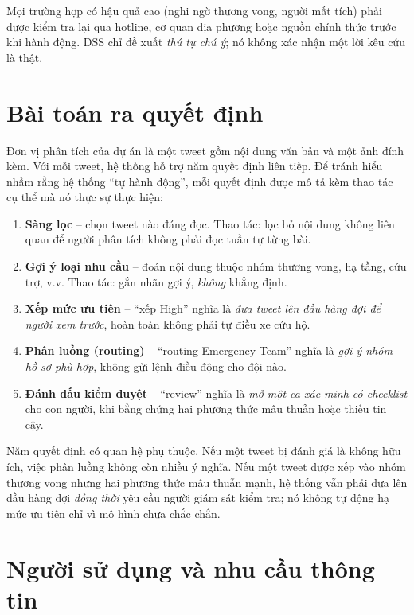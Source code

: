 \begin{insight}
Mọi trường hợp có hậu quả cao (nghi ngờ thương vong, người mất tích) phải được
kiểm tra lại qua hotline, cơ quan địa phương hoặc nguồn chính thức trước khi
hành động. DSS chỉ đề xuất \emph{thứ tự chú ý}; nó không xác nhận một lời kêu
cứu là thật.
\end{insight}

\section{Bài toán ra quyết định}

Đơn vị phân tích của dự án là một tweet gồm nội dung văn bản và một ảnh đính
kèm. Với mỗi tweet, hệ thống hỗ trợ năm quyết định liên tiếp. Để tránh hiểu
nhầm rằng hệ thống ``tự hành động'', mỗi quyết định được mô tả kèm thao tác cụ
thể mà nó thực sự thực hiện:

\begin{enumerate}[leftmargin=*]
  \item \textbf{Sàng lọc} -- chọn tweet nào đáng đọc. Thao tác: lọc bỏ nội dung
        không liên quan để người phân tích không phải đọc tuần tự từng bài.
  \item \textbf{Gợi ý loại nhu cầu} -- đoán nội dung thuộc nhóm thương vong, hạ
        tầng, cứu trợ, v.v. Thao tác: gắn nhãn gợi ý, \emph{không} khẳng định.
  \item \textbf{Xếp mức ưu tiên} -- ``xếp High'' nghĩa là \emph{đưa tweet lên
        đầu hàng đợi để người xem trước}, hoàn toàn không phải tự điều xe cứu hộ.
  \item \textbf{Phân luồng (routing)} -- ``routing Emergency Team'' nghĩa là
        \emph{gợi ý nhóm hồ sơ phù hợp}, không gửi lệnh điều động cho đội nào.
  \item \textbf{Đánh dấu kiểm duyệt} -- ``review'' nghĩa là \emph{mở một ca xác
        minh có checklist} cho con người, khi bằng chứng hai phương thức mâu
        thuẫn hoặc thiếu tin cậy.
\end{enumerate}

Năm quyết định có quan hệ phụ thuộc. Nếu một tweet bị đánh giá là không hữu ích,
việc phân luồng không còn nhiều ý nghĩa. Nếu một tweet được xếp vào nhóm thương
vong nhưng hai phương thức mâu thuẫn mạnh, hệ thống vẫn phải đưa lên đầu hàng đợi
\emph{đồng thời} yêu cầu người giám sát kiểm tra; nó không tự động hạ mức ưu tiên
chỉ vì mô hình chưa chắc chắn.

\section{Người sử dụng và nhu cầu thông tin}

